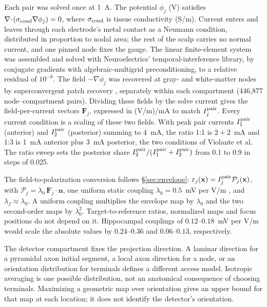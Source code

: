 \documentclass[11pt,a4paper]{article}
\begin{document}
Each pair was solved once at 1~A. The potential $\phi_j$ (V) satisfies
$\nabla\!\cdot\!(\sigma_{\rm cond}\nabla\phi_j)=0$, where
$\sigma_{\rm cond}$ is tissue conductivity (S/m). Current enters and leaves through each
electrode's metal contact as a Neumann condition, distributed in proportion to nodal
area; the rest of the scalp carries no normal current, and one pinned node fixes the
gauge. The linear finite-element system was assembled and solved with Neuroelectrics'
temporal-interference library, by conjugate gradients with algebraic-multigrid
preconditioning, to a relative residual of $10^{-8}$. The field
$-\nabla\phi_j$ was recovered at gray- and white-matter
nodes by superconvergent patch recovery \cite{zienkiewicz1992}, separately within each
compartment (446{,}877 node--compartment pairs). Dividing these fields by the solve
current gives the field-per-current vectors $\mathbf F_j$, expressed in
(V/m)/mA to match $I_j^{\rm pair}$. Every current condition is a scaling of these two fields.
With peak pair currents $I_1^{\rm pair}$ (anterior) and
$I_2^{\rm pair}$ (posterior) summing to 4~mA, the ratio 1:1 is $2+2$~mA and 1:3 is
1~mA anterior plus 3~mA posterior, the two conditions of Violante et al. The ratio sweep
sets the posterior share $I_2^{\rm pair}/(I_1^{\rm pair}+I_2^{\rm pair})$ from 0.1 to
0.9 in steps of 0.025.

The field-to-polarization conversion follows \S\ref{sec:envelope}:
$\varepsilon_j(\mathbf x)=I_j^{\rm pair}\mathcal P_j(\mathbf x)$, with
$\mathcal P_j=\lambda_0\,\mathbf F_j\!\cdot\!\mathbf n$, one uniform
static coupling $\lambda_0=0.5$~mV per V/m \cite{radman2009}, and
$\lambda_f\approx\lambda_0$. A uniform coupling multiplies the envelope map by
$\lambda_0$ and the two second-order maps by $\lambda_0^2$. Target-to-reference ratios,
normalized maps and focus positions do not depend on it. Hippocampal couplings of
$0.12$--$0.18$~mV per V/m \cite{bikson2004,deans2007} would scale the absolute values
by $0.24$--$0.36$ and $0.06$--$0.13$, respectively.

The detector compartment fixes the projection direction. A laminar direction for a pyramidal
axon initial segment, a local axon direction for a node, or an orientation
distribution for terminals defines a different access model. Isotropic averaging
is one possible distribution, not an anatomical consequence of choosing terminals.
Maximizing a geometric map over orientation gives an upper bound for that map
at each location; it does not identify the detector's orientation.
\end{document}
